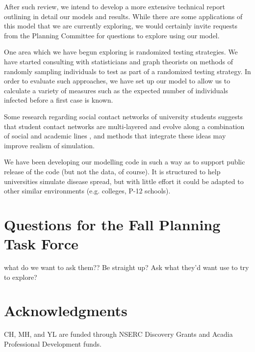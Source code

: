 \documentclass[fleqn,10pt]{SelfArx} %
\newcommand{\ed}[1]{{\color{blue} #1}}
\begin{document}
After such review, we intend to develop a more extensive technical report outlining in detail our models and results.  While there are some applications of this model that we are currently exploring, we would certainly invite requests from the Planning Committee for questions to explore using our model. 

One area which we have begun exploring is randomized testing strategies.  We have started consulting with statisticians and graph theorists on methods of randomly sampling individuals to test as part of a randomized testing strategy.  In order to evaluate such approaches, we have set up our model to allow us to calculate a variety of measures such as the expected number of individuals infected before a first case is known.

Some research regarding social contact networks of university students suggests that student contact networks are multi-layered and evolve along a combination of social and academic lines \cite{stadtfeld_integration_2019}, and methods that integrate these ideas may improve realism of simulation.

We have been developing our modelling code in such a way as to support public release of the code (but not the data, of course).  It is structured to help universities simulate disease spread, but with little effort it could be adapted to other similar environments (e.g. colleges, P-12 schools).


\section{Questions for the Fall Planning Task Force}

\ed{what do we want to ask them??  Be straight up?  Ask what they'd want use to try to explore?}

\section*{Acknowledgments} %
CH, MH, and YL  are funded through NSERC Discovery Grants and Acadia Professional Development funds. 







\end{document}
